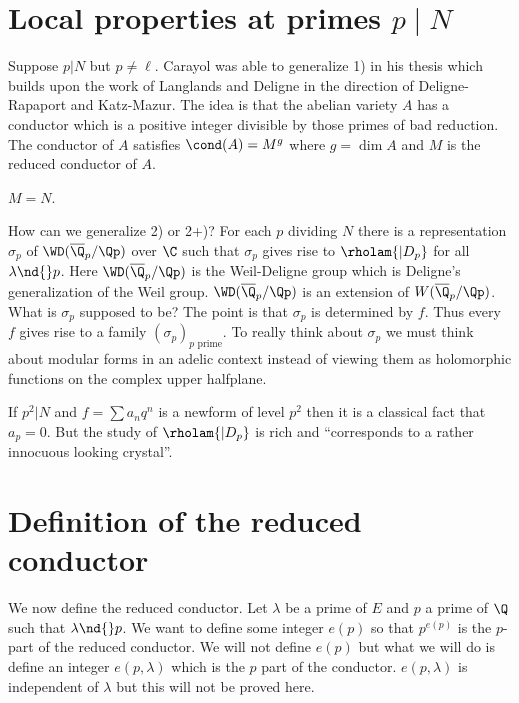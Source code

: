 \documentclass{report}
\begin{document}
\section{Local properties at primes $p\mid{}N$}
Suppose $p|N$ but $p\neq\ell$. Carayol was able to generalize
1) in his thesis which builds upon the work of Langlands and Deligne
in the direction of Deligne-Rapaport and Katz-Mazur. The idea is that
the abelian variety $A$ has a conductor which is a positive integer
divisible by those primes of bad reduction.  The conductor of $A$ satisfies
$\cond(A)=M^g$ where $g=\dim A$ and $M$ is the reduced conductor of $A$.
\begin{theorem}[Carayol] $M=N$. \end{theorem}

How can we generalize 2) or 2+)? For each $p$ dividing $N$ there is a
representation $\sigma_p$ of $\WD(\overline{\Q}_p/\Qp)$ over $\C$
such that $\sigma_p$ gives rise to $\rholam{|D_p}$ for all $\lambda\nd{}p$.
Here $\WD(\overline{\Q}_p/\Qp)$ is the Weil-Deligne group which is
Deligne's generalization of the Weil group. $\WD(\overline{\Q}_p/\Qp)$
is an extension of $W(\overline{\Q}_p/\Qp)$. What is $\sigma_p$ supposed
to be? The point is that $\sigma_p$ is determined by $f$. Thus every
$f$ gives rise to a family $(\sigma_p)_{\text{$p$ prime}}$. To
really think about $\sigma_p$ we must think about modular forms in an
adelic context instead of viewing them as holomorphic functions on the
complex upper halfplane.

If $p^2|N$ and $f=\sum a_n q^n$ is a newform of level $p^2$
then it is a classical fact that $a_p=0$. But the study
of $\rholam{|D_p}$ is rich and ``corresponds to a rather
innocuous looking crystal''.

\section{Definition of the reduced conductor}
We now define the reduced conductor. Let $\lambda$ be a
prime of $E$ and $p$ a prime of $\Q$ such that
$\lambda\nd{}p$. We want to define some integer $e(p)$
so that $p^{e(p)}$ is the $p$-part of the reduced conductor.
We will not define $e(p)$ but what we will do is define
an integer $e(p,\lambda)$ which is the $p$ part of the conductor.
$e(p,\lambda)$ is independent of $\lambda$ but this will not
be proved here.
\end{document}
